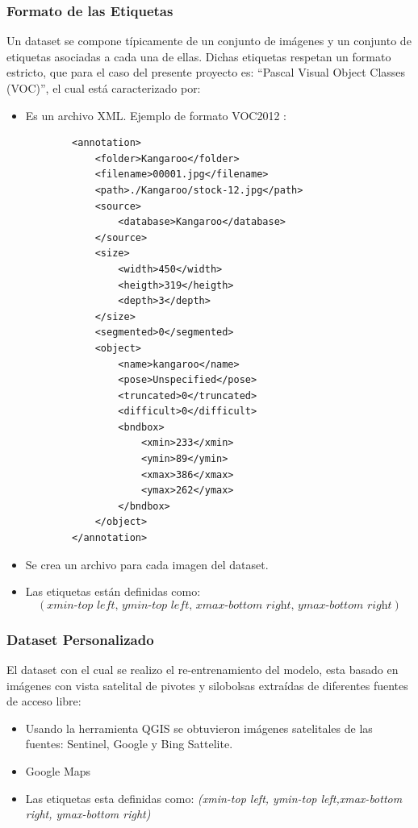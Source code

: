 \newpage
\subsubsection{Formato de las Etiquetas} 
Un dataset se compone típicamente de un conjunto de imágenes y un conjunto de etiquetas asociadas a cada una de ellas. Dichas etiquetas respetan un formato estricto, que para el caso del presente proyecto es: ``Pascal Visual Object Classes (VOC)'', el cual está caracterizado por:

\begin{itemize}
    \item Es un archivo XML. Ejemplo de formato VOC2012 \cite{etiqueta} :
    
        \begin{lstlisting}
        <annotation>
            <folder>Kangaroo</folder>
            <filename>00001.jpg</filename>
            <path>./Kangaroo/stock-12.jpg</path>
            <source>
                <database>Kangaroo</database>
            </source>
            <size>
                <width>450</width>
                <heigth>319</heigth>
                <depth>3</depth>
            </size>
            <segmented>0</segmented>
            <object>
                <name>kangaroo</name>
                <pose>Unspecified</pose>
                <truncated>0</truncated>
                <difficult>0</difficult>
                <bndbox>
                    <xmin>233</xmin>
                    <ymin>89</ymin>
                    <xmax>386</xmax>
                    <ymax>262</ymax>
                </bndbox>
            </object>
        </annotation>
        \end{lstlisting}
    \item Se crea un archivo para cada imagen del dataset.
    \item Las etiquetas están definidas como: \[(\textit{xmin-top left, ymin-top left, xmax-bottom right, ymax-bottom right})\]
\end{itemize}

\newpage
\subsubsection{Dataset Personalizado}
El dataset con el cual se realizo el re-entrenamiento del modelo, esta basado en imágenes con vista satelital de pivotes y silobolsas extraídas de diferentes fuentes de acceso libre:
\begin{itemize}
    \item Usando la herramienta QGIS \cite{qgis} se obtuvieron imágenes satelitales de las fuentes: Sentinel, Google y Bing Sattelite.
    \item Google Maps
    \item Las etiquetas esta definidas como: \textit{(xmin-top left, ymin-top left,xmax-bottom right, ymax-bottom right)}
\end{itemize}

